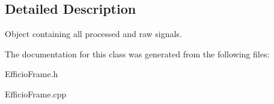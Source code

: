 \subsection{Detailed Description}
Object containing all processed and raw signals. 

The documentation for this class was generated from the following files\+:\begin{DoxyCompactItemize}
\item 
Efficio\+Frame.\+h\item 
Efficio\+Frame.\+cpp\end{DoxyCompactItemize}
